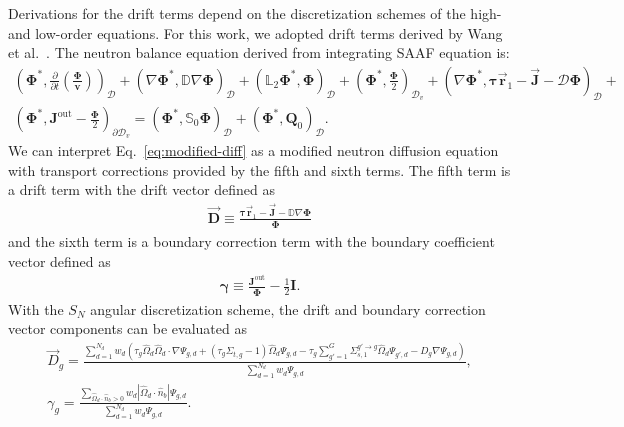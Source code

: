 \documentclass[letterpaper]{mc2025}
\begin{document}
Derivations for the drift terms depend on the discretization schemes of the high- and low-order
equations. For this work, we adopted drift terms derived by Wang et al.\
\cite{wang_diffusion_2014, wang_rattlesnake_2018}. The neutron balance equation derived from
integrating \gls{SAAF} equation is:
%
\begin{multline}
  \left(\bm{\Phi}^*,\frac{\partial}{\partial t}\left(\frac{\bm{\Phi}}{\bm{v}}\right)\right)_\mathcal{D}
  + \left(\nabla\bm{\Phi}^*, \mathbb{D}\nabla\bm{\Phi}\right)_\mathcal{D}
  + \left(\mathbb{L}_2\bm{\Phi}^*,\bm{\Phi}\right)_\mathcal{D}
  + \left(\bm{\Phi}^*,\frac{\bm{\Phi}}{2}\right)_{\mathcal{D}_v}
  + \left(\nabla\bm{\Phi}^*,\bm{\tau}\vec{\bm{r}}_1-\vec{\bm{J}}-\mathcal{D}\bm{\Phi}\right)_\mathcal{D}
  + \\
  \left(\bm{\Phi}^*,\bm{J}^\text{out}-\frac{\bm{\Phi}}{2}\right)_{\partial\mathcal{D}_v}
  = \left(\bm{\Phi}^*,\mathbb{S}_0\bm{\Phi}\right)_\mathcal{D}
  + \left(\bm{\Phi}^*,\bm{Q}_0\right)_\mathcal{D}. \label{eq:modified-diff}
\end{multline}
%
We can interpret Eq.\ \ref{eq:modified-diff} as a modified neutron diffusion equation with
transport corrections provided by the fifth and sixth terms. The fifth term is a drift term with
the drift vector defined as
%
\begin{gather}
  \vec{\bm{D}} \equiv \frac{\bm{\tau}\vec{\bm{r}}_1-\vec{\bm{J}}-\mathbb{D}\nabla\bm{\Phi}}{\bm{\Phi}}
\end{gather}
%
and the sixth term is a boundary correction term with the boundary coefficient vector defined as
%
\begin{gather}
  \bm{\gamma} \equiv \frac{\bm{J}^\text{out}}{\bm{\Phi}}-\frac{1}{2}\bm{I}.
\end{gather}
%
With the $S_N$ angular discretization scheme, the drift and boundary correction vector components
can be evaluated as
%
\begin{gather}
  \vec{D}_g = \frac{\sum^{N_d}_{d=1}w_d\left(\tau_g\hat{\Omega}_d\hat{\Omega}_d\cdot\nabla\Psi_{g,d}
  + \left(\tau_g\Sigma_{t,g}-1\right)\hat{\Omega}_d\Psi_{g,d}
  - \tau_g\sum^G_{g'=1}\Sigma^{g'\rightarrow g}_{s,1}\hat{\Omega}_d\Psi_{g',d}
  - D_g\nabla\Psi_{g,d}\right)}{\sum^{N_d}_{d=1}w_d\Psi_{g,d}}, \label{eq:drift} \\
  \gamma_g =
  \frac{\sum_{\hat{\Omega}_d\cdot\hat{n}_b > 0}w_d |\hat{\Omega}_d\cdot\hat{n}_b |
  \Psi_{g,d}}{\sum^{N_d}_{d=1}w_d\Psi_{g,d}}. \label{eq:bound-coef}
\end{gather}
\end{document}
